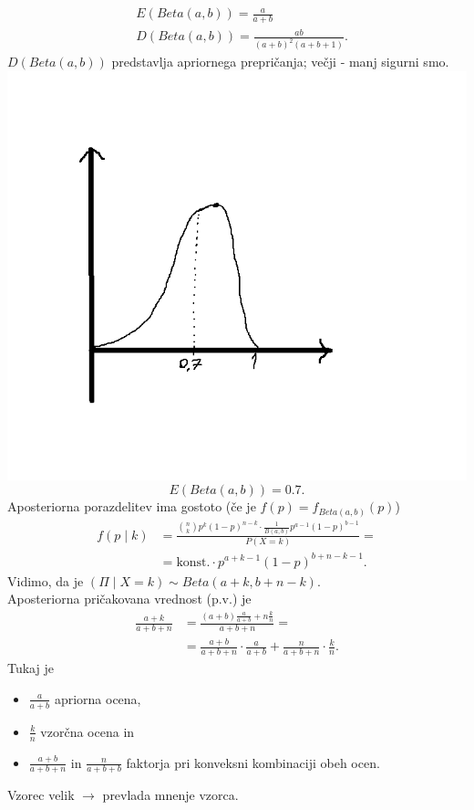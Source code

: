 \documentclass[a4paper, 12pt]{book}
\theoremstyle{definition}
\theoremstyle{remark}
\begin{document}
\begin{align*}
  &E(Beta(a,b)) = \frac{a}{a+b} \\
  &D(Beta(a,b)) = \frac{ab}{(a+b)^2 (a+b+1)}.
\end{align*}
$D(Beta(a,b))$ predstavlja  apriornega prepričanja; večji - manj sigurni smo. \\
\includegraphics[scale=0.4]{aposteriori_1_4} \\
\begin{equation*}
  E(Beta(a,b)) = 0.7.
\end{equation*}
Aposteriorna porazdelitev ima gostoto (če je $f(p) = f_{Beta(a,b)}(p)$)
\begin{align*}
  f(p \mid k) &= \frac{\binom{n}{k} p^k (1-p)^{n-k} \cdot \frac{1}{B(a,b)} p^{a-1} (1-p)^{b-1}}{P(X = k)} = \\
  &= \text{konst.} \cdot p^{a+k-1} (1-p)^{b+n-k-1}.
\end{align*}
Vidimo, da je $(\Pi \mid X = k) \sim Beta(a+k, b+n-k)$. \\
Aposteriorna pričakovana vrednost (p.v.) je
\begin{align*}
  \frac{a+k}{a+b+n} &= \frac{(a+b)\frac{a}{a+b} + n \frac{k}{n}}{a+b+n} = \\
  &= \frac{a+b}{a+b+n} \cdot \frac{a}{a+b} + \frac{n}{a+b+n} \cdot \frac{k}{n}.
\end{align*}
Tukaj je
\begin{itemize}
  \item $\frac{a}{a+b}$ apriorna ocena,
  \item $\frac{k}{n}$ vzorčna ocena in
  \item $\frac{a+b}{a+b+n}$ in $\frac{n}{a+b+b}$ faktorja pri konveksni kombinaciji obeh ocen.
\end{itemize}
Vzorec velik $\to$ prevlada mnenje vzorca.
\end{document}
